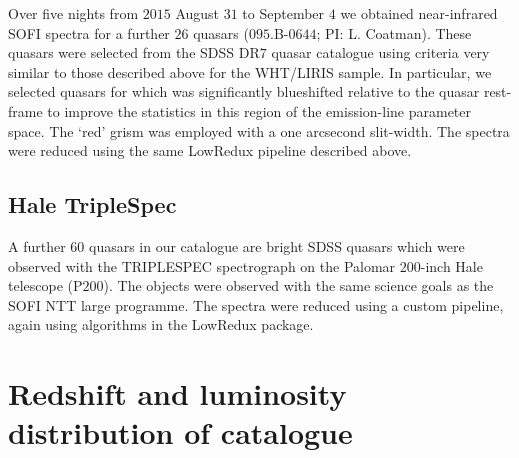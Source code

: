 Over five nights from $2015$ August $31$ to September $4$ we obtained near-infrared SOFI spectra for a further $26$ quasars ($095$.B-$0644$; PI: L. Coatman). 
These quasars were selected from the SDSS DR$7$ quasar catalogue using criteria very similar to those described above for the WHT/LIRIS sample. 
In particular, we selected quasars for which  was significantly blueshifted relative to the quasar rest-frame to improve the statistics in this region of the  emission-line parameter space. 
The `red' grism was employed with a one arcsecond slit-width. 
The spectra were reduced using the same LowRedux pipeline described above. 

\subsection{Hale TripleSpec}

A further $60$ quasars in our catalogue are bright SDSS quasars which were observed with the TRIPLESPEC spectrograph \citep{herter08} on the Palomar $200$-inch Hale telescope (P$200$). 
The objects were observed with the same science goals as the SOFI NTT large programme. 
The spectra were reduced using a custom pipeline, again using algorithms in the LowRedux package. 

\section[Redshift and luminosity distribution]{Redshift and luminosity distribution of catalogue}

